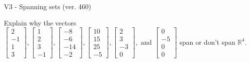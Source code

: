 \begin{exercise}
  \begin{exerciseTitle}V3 - Spanning sets (ver. 460)\end{exerciseTitle}
  \begin{exerciseStatement}
    Explain why the vectors \(\left[\begin{array}{r}
2 \\
-1 \\
1 \\
3
\end{array}\right] , \left[\begin{array}{r}
1 \\
2 \\
3 \\
-1
\end{array}\right] , \left[\begin{array}{r}
-8 \\
-6 \\
-14 \\
-2
\end{array}\right] , \left[\begin{array}{r}
10 \\
15 \\
25 \\
-5
\end{array}\right] , \left[\begin{array}{r}
2 \\
3 \\
-3 \\
0
\end{array}\right] , \text{ and } \left[\begin{array}{r}
0 \\
-5 \\
0 \\
0
\end{array}\right]\) span or don't span \(\mathbb{R}^4\). 
	



\end{exerciseStatement}
\end{exercise}
